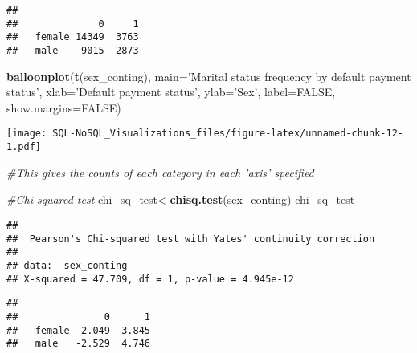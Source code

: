\documentclass[]{article}
\newenvironment{Shaded}{\begin{snugshade}}{\end{snugshade}}
\newcommand{\KeywordTok}[1]{\textcolor[rgb]{0.13,0.29,0.53}{\textbf{#1}}}
\newcommand{\DataTypeTok}[1]{\textcolor[rgb]{0.13,0.29,0.53}{#1}}
\newcommand{\DecValTok}[1]{\textcolor[rgb]{0.00,0.00,0.81}{#1}}
\newcommand{\StringTok}[1]{\textcolor[rgb]{0.31,0.60,0.02}{#1}}
\newcommand{\CommentTok}[1]{\textcolor[rgb]{0.56,0.35,0.01}{\textit{#1}}}
\newcommand{\OtherTok}[1]{\textcolor[rgb]{0.56,0.35,0.01}{#1}}
\newcommand{\OperatorTok}[1]{\textcolor[rgb]{0.81,0.36,0.00}{\textbf{#1}}}
\newcommand{\NormalTok}[1]{#1}
\begin{document}
\begin{verbatim}
##         
##              0     1
##   female 14349  3763
##   male    9015  2873
\end{verbatim}

\begin{Shaded}
\begin{Highlighting}[]
\KeywordTok{balloonplot}\NormalTok{(}\KeywordTok{t}\NormalTok{(sex_conting), }\DataTypeTok{main=}\StringTok{'Marital status frequency by default payment status'}\NormalTok{, }\DataTypeTok{xlab=}\StringTok{'Default payment status'}\NormalTok{, }\DataTypeTok{ylab=}\StringTok{'Sex'}\NormalTok{, }\DataTypeTok{label=}\OtherTok{FALSE}\NormalTok{, }\DataTypeTok{show.margins=}\OtherTok{FALSE}\NormalTok{)}
\end{Highlighting}
\end{Shaded}

\texttt{[image: SQL-NoSQL\_Visualizations\_files/figure-latex/unnamed-chunk-12-1.pdf]}

\begin{Shaded}
\begin{Highlighting}[]
\CommentTok{#This gives the counts of each category in each 'axis' specified}

\CommentTok{#Chi-squared test}
\NormalTok{chi_sq_test<-}\KeywordTok{chisq.test}\NormalTok{(sex_conting)}
\NormalTok{chi_sq_test}
\end{Highlighting}
\end{Shaded}

\begin{verbatim}
## 
##  Pearson's Chi-squared test with Yates' continuity correction
## 
## data:  sex_conting
## X-squared = 47.709, df = 1, p-value = 4.945e-12
\end{verbatim}

\begin{Shaded}
\end{Shaded}

\begin{verbatim}
##         
##               0      1
##   female  2.049 -3.845
##   male   -2.529  4.746
\end{verbatim}
\end{document}
